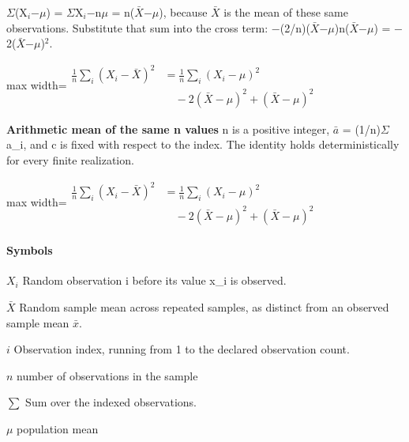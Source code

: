 \documentclass[11pt,a4paper]{article}
\begin{document}
\ensuremath{\Sigma}(X\ensuremath{{}_i}\ensuremath{-}\ensuremath{\mu}) = \ensuremath{\Sigma}X\ensuremath{{}_i}\ensuremath{-}n\ensuremath{\mu} = n(\ensuremath{\bar{X}}\ensuremath{-}\ensuremath{\mu}), because \ensuremath{\bar{X}} is the mean of these same observations. Substitute that sum into the cross term: \ensuremath{-}(2/n)(\ensuremath{\bar{X}}\ensuremath{-}\ensuremath{\mu})n(\ensuremath{\bar{X}}\ensuremath{-}\ensuremath{\mu}) = \ensuremath{-}2(\ensuremath{\bar{X}}\ensuremath{-}\ensuremath{\mu})\ensuremath{{}^2}.
\begin{center}\begin{adjustbox}{max width=\linewidth}$\displaystyle \begin{aligned}\frac1n\sum_i(X_i-\bar X)^2&=\frac1n\sum_i(X_i-\mu)^2\\&\quad-2(\bar X-\mu)^2+(\bar X-\mu)^2\end{aligned}$\end{adjustbox}\end{center}

\par\textbf{Arithmetic mean of the same n values} n is a positive integer, \ensuremath{\bar{a}} = (1/n)\ensuremath{\Sigma}a\_i, and c is fixed with respect to the index. The identity holds deterministically for every finite realization.
\begin{center}\begin{adjustbox}{max width=\linewidth}$\displaystyle \begin{aligned}\frac1n\sum_i(X_i-\bar X)^2&=\frac1n\sum_i(X_i-\mu)^2\\&\quad-2(\bar X-\mu)^2+(\bar X-\mu)^2\end{aligned}$\end{adjustbox}\end{center}

\paragraph{Symbols}
\par\noindent\textbf{\(X_i\)} Random observation i before its value x\_i is observed.
\par\noindent\textbf{\(\bar X\)} Random sample mean across repeated samples, as distinct from an observed sample mean \ensuremath{\bar{x}}.
\par\noindent\textbf{\(i\)} Observation index, running from 1 to the declared observation count.
\par\noindent\textbf{\(n\)} number of observations in the sample
\par\noindent\textbf{\(\sum\)} Sum over the indexed observations.
\par\noindent\textbf{\(\mu\)} population mean
\end{document}
